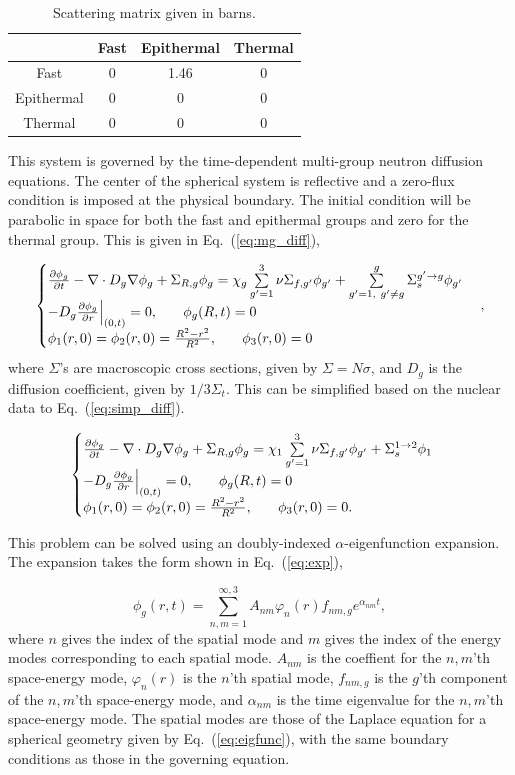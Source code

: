 \documentclass[12pt]{article}
\newcommand{\dxdy}[2]{\frac{\partial #1}{\partial #2}}
\newcommand{\be}{\begin{equation}}
\newcommand{\ee}{\end{equation}}
\newcommand{\pev}{\hspace{0.25in}}
\newcommand{\LEQ}[1]{\label{eq:#1}}
\newcommand{\EQ}[1]{Eq.~(\ref{eq:#1})}
\newcommand{\LTA}[1]{\label{ta:#1}}
\newcommand{\bt}{\begin{table}}
\newcommand{\et}{\end{table}}
\newcommand{\btb}{\begin{center}\begin{tabular}}
\newcommand{\etb}{\end{tabular}\end{center}}
\begin{document}
\bt[h] \centering 
	\caption{Scattering matrix given in barns.} 
	\btb{|c|c|c|c|}
		\hline
		\diagbox{From}{To}& Fast  & Epithermal  & Thermal  \\  \hline
		Fast  & 0 & 1.46 & 0 \\  \hline
		Epithermal & 0 & 0 & 0 \\  \hline
		Thermal  & 0 & 0 & 0 \\  \hline
	\etb \LTA{scat}
\et

This system is governed by the time-dependent multi-group neutron diffusion equations. 
The center of the spherical system is reflective and a zero-flux condition is imposed at the physical boundary. 
The initial condition will be parabolic in space for both the fast and epithermal groups and zero for the thermal group. 
This is given in \EQ{mg_diff},

\be
	\begin{cases}
		\dxdy{\phi_g}{t} - \nabla \cdot D_g \nabla \phi_g + \Sigma_{R,g} \phi_g 
			= \chi_g \sum\limits_{g'=1}^{3} \nu\Sigma_{f,g'} \phi_{g'} + 
		 	\sum\limits_{g'=1, \ g' \neq g}^g \Sigma_s^{g' \rightarrow g} \phi_{g'} \\
		-D_g \dxdy{\phi_g}{r} \Big\rvert_{(0,t)} = 0, \pev \phi_g(R,t) = 0 \\
			\phi_1(r,0) = \phi_2(r,0) = \frac{R^2 - r^2}{R^2}, \pev \phi_3(r,0) = 0
	\end{cases} ,
	\LEQ{mg_diff}
\ee 
where $\Sigma$'s are macroscopic cross sections, given by $\Sigma = N\sigma$, and $D_g$ is the diffusion coefficient, given by $1/3\Sigma_t$. 
This can be simplified based on the nuclear data to \EQ{simp_diff}.

\be
	\begin{cases}
		\dxdy{\phi_g}{t} - \nabla \cdot D_g \nabla \phi_g + \Sigma_{R,g} \phi_g 
			= \chi_1 \sum\limits_{g'=1}^{3} \nu\Sigma_{f,g'} \phi_{g'} + 
			\Sigma_s^{1 \rightarrow 2} \phi_{1} \\
		-D_g \dxdy{\phi_g}{r} \Big\rvert_{(0,t)} = 0, \pev \phi_g(R,t) = 0 \\
		\phi_1(r,0) = \phi_2(r,0) = \frac{R^2 - r^2}{R^2}, \pev \phi_3(r,0) = 0.
	\end{cases} 
	\LEQ{simp_diff}
\ee

This problem can be solved using an doubly-indexed $\alpha$-eigenfunction expansion.  
The expansion takes the form shown in \EQ{exp},

\be
	\phi_g(r, t) = \sum_{n, m = 1}^{\infty, 3} A_{nm} \varphi_n(r) f_{nm, g} e^{\alpha_{nm} t},
\LEQ{exp} \ee
where $n$ gives the index of the spatial mode and $m$ gives the index of the energy modes 
	corresponding to each spatial mode.
$A_{nm}$ is the coeffient for the $n,m$'th space-energy mode, $\varphi_n(r)$ is the $n$'th spatial 
	mode, $f_{nm, g}$ is the $g$'th component of the $n,m$'th space-energy mode, and $\alpha_{nm}$ 
	is the time eigenvalue for the $n,m$'th space-energy mode. 
The spatial modes are those of the Laplace equation for a spherical geometry given by \EQ{eigfunc}, 
	with the same boundary conditions as those in the governing equation.
\end{document}
